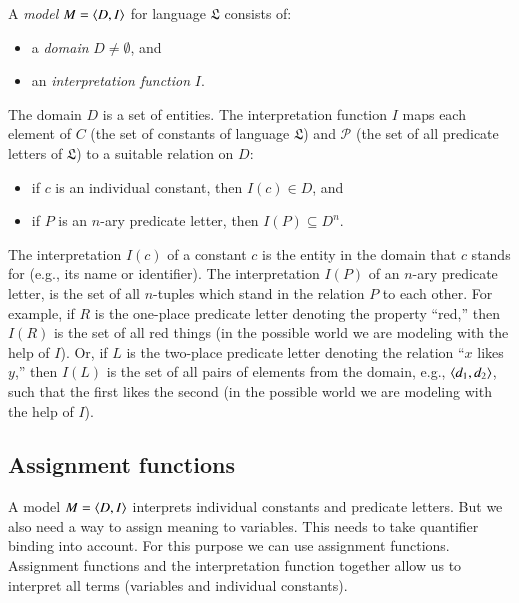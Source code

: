 \documentclass[nobib,nofonts]{tufte-handout}
\begin{document}
A \emph{model} $M = \left \langle D,I\right\rangle$ for language $\mathfrak{L}$ consists of:
\begin{multicols}{2}
  \begin{itemize}
    \item[] a \emph{domain} $D \neq \emptyset$, and
    \item[] an \emph{interpretation function} $I$.
  \end{itemize}
\end{multicols}
\noindent The domain $D$ is a set of entities.
The interpretation function $I$ maps each element of $C$ (the set of constants of language $\mathfrak{L}$) and $\mathcal{P}$ (the set of all predicate letters of $\mathfrak{L}$) to a suitable relation on $D$:
\begin{itemize}
  \item[] if $c$ is an individual constant, then $I(c) \in D$, and
  \item[] if $P$ is an $n$-ary predicate letter, then $I(P) \subseteq D^n$.
\end{itemize}
The interpretation $I(c)$ of a constant $c$ is the entity in the domain that $c$ stands for (e.g., its name or identifier).
The interpretation $I(P)$ of an $n$-ary predicate letter, is the set of all $n$-tuples which stand in the relation $P$ to each other.
For example, if $R$ is the one-place predicate letter denoting the property ``red,'' then $I(R)$ is the set of all red things (in the possible world we are modeling with the help of $I$).
Or, if $L$ is the two-place predicate letter denoting the relation ``$x$ likes $y$,'' then $I(L)$ is the set of all pairs of elements from the domain, e.g., $\left \langle d_{1}, d_{2}\right\rangle$, such that the first likes the second (in the possible world we are modeling with the help of $I$).

\subsection{Assignment functions}
\label{sec:assignments--term}

A model $M = \left \langle D,I\right\rangle$ interprets individual constants and predicate letters.
But we also need a way to assign meaning to variables.
This needs to take quantifier binding into account.
For this purpose we can use assignment functions.
Assignment functions and the interpretation function together allow us to interpret all terms (variables and individual constants).
\end{document}
